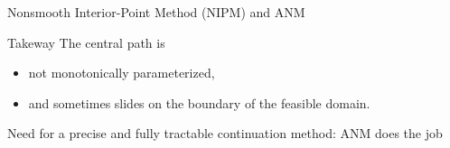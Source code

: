 \begin{frame}{Nonsmooth Interior-Point Method (NIPM) and ANM}
\begin{block}{Takeway}
  The central path is
  \begin{itemize}
  \item  not monotonically parameterized, 
  \item  and sometimes slides on the boundary of the feasible domain.
  \end{itemize}

   Need for a precise and fully tractable continuation method: ANM does the job
\end{block}
\end{frame}

